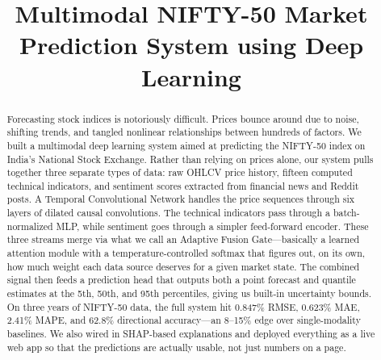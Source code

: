 \documentclass[conference]{IEEEtran}
\begin{document}
\title{Multimodal NIFTY-50 Market Prediction System using Deep Learning}

\author{
\and
{}
\and
{}
}

\maketitle

\begin{abstract}
Forecasting stock indices is notoriously difficult. Prices bounce around due to noise, shifting trends, and tangled nonlinear relationships between hundreds of factors. We built a multimodal deep learning system aimed at predicting the NIFTY-50 index on India's National Stock Exchange. Rather than relying on prices alone, our system pulls together three separate types of data: raw OHLCV price history, fifteen computed technical indicators, and sentiment scores extracted from financial news and Reddit posts. A Temporal Convolutional Network handles the price sequences through six layers of dilated causal convolutions. The technical indicators pass through a batch-normalized MLP, while sentiment goes through a simpler feed-forward encoder. These three streams merge via what we call an Adaptive Fusion Gate---basically a learned attention module with a temperature-controlled softmax that figures out, on its own, how much weight each data source deserves for a given market state. The combined signal then feeds a prediction head that outputs both a point forecast and quantile estimates at the 5th, 50th, and 95th percentiles, giving us built-in uncertainty bounds. On three years of NIFTY-50 data, the full system hit 0.847\% RMSE, 0.623\% MAE, 2.41\% MAPE, and 62.8\% directional accuracy---an 8--15\% edge over single-modality baselines. We also wired in SHAP-based explanations and deployed everything as a live web app so that the predictions are actually usable, not just numbers on a page.
\end{abstract}
\end{document}
